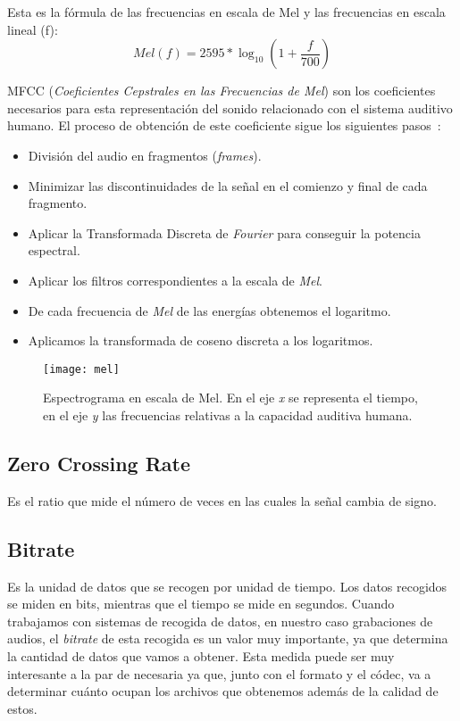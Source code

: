 Esta es la fórmula de las frecuencias en escala de Mel y las frecuencias en escala lineal (f)\cite{wiki:mel,villa2012automatic}: \[ Mel(f) = 2595 * \log_{10}(1+\frac{f}{700})\]

MFCC (\textit{Coeficientes Cepstrales en las Frecuencias de Mel}) son los coeficientes necesarios para esta representación del sonido relacionado con el sistema auditivo humano. El proceso de obtención de este coeficiente sigue los siguientes pasos~\cite{wiki:mel,yeo2011animal}:
\begin{itemize}
	\item División del audio en fragmentos (\textit{frames}).
	\item Minimizar las discontinuidades de la señal en el comienzo y final de cada fragmento.
	\item Aplicar la Transformada Discreta de \textit{Fourier} para conseguir la potencia espectral.
	\item Aplicar los filtros correspondientes a la escala de \textit{Mel}.
	\item De cada frecuencia de \textit{Mel} de las energías obtenemos el logaritmo.
	\item Aplicamos la transformada de coseno discreta a los logaritmos.
\end{itemize}
\begin{figure}
	\centering
	\texttt{[image: mel]}
	\caption{Espectrograma en escala de Mel. En el eje \textit{x} se representa el tiempo, en el eje \textit{y} las frecuencias relativas a la capacidad auditiva humana.}
	\label{fig:mel}
\end{figure}

\subsection{Zero Crossing Rate} \label{zcr}
Es el ratio que mide el número de veces en las cuales la señal cambia de signo.
\subsection{Bitrate}
Es la unidad de datos que se recogen por unidad de tiempo. Los datos recogidos se miden en bits, mientras que el tiempo se mide en segundos.
Cuando trabajamos con sistemas de recogida de datos, en nuestro caso grabaciones de audios, el \textit{bitrate} de esta recogida es un valor muy importante, ya que determina la cantidad de datos que vamos a obtener. Esta medida puede ser muy interesante a la par de necesaria ya que, junto con el formato y el códec, va a determinar cuánto ocupan los archivos que obtenemos además de la calidad de estos.
